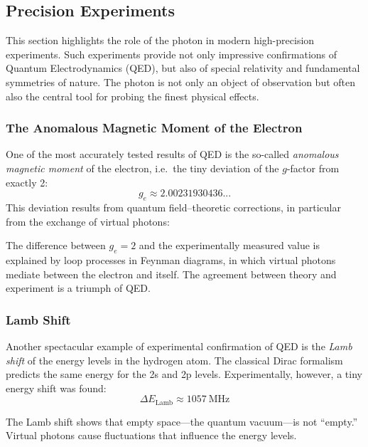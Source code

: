 \subsection{Precision Experiments}

This section highlights the role of the photon in modern high-precision experiments. Such experiments provide not only impressive confirmations of Quantum Electrodynamics (QED), but also of special relativity and fundamental symmetries of nature. The photon is not only an object of observation but often also the central tool for probing the finest physical effects.

\subsubsection{The Anomalous Magnetic Moment of the Electron}

One of the most accurately tested results of QED is the so-called \emph{anomalous magnetic moment} of the electron, i.e.\ the tiny deviation of the $g$-factor from exactly 2:
\[
g_e \approx 2.00231930436...
\]
This deviation results from quantum field–theoretic corrections, in particular from the exchange of virtual photons:
\vspace{1em}
\begin{tcolorbox}[physikbox,title=Physical Meaning]
	\label{box:physikalische Bedeutung}
	The difference between $g_e = 2$ and the experimentally measured value is explained by loop processes in Feynman diagrams, in which virtual photons mediate between the electron and itself. The agreement between theory and experiment is a triumph of QED.
\end{tcolorbox}

\subsubsection{Lamb Shift}

Another spectacular example of experimental confirmation of QED is the \emph{Lamb shift} of the energy levels in the hydrogen atom. The classical Dirac formalism predicts the same energy for the 2s and 2p levels. Experimentally, however, a tiny energy shift was found:
\[
\Delta E_\text{Lamb} \approx \SI{1057}{\mega\hertz}
\]
\vspace{0.5em}
\begin{tcolorbox}[didaktikbox,title=Why Is This Important?]
	\label{box:Warum ist wichtig}
	The Lamb shift shows that empty space—the quantum vacuum—is not “empty.” Virtual photons cause fluctuations that influence the energy levels.
\end{tcolorbox}

